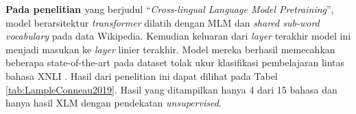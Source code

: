 \textbf{Pada penelitian \parencite{LampleConneau2019}} yang berjudul “\textit{Cross-lingual Language Model Pretraining}”, model berarsitektur \textit{transformer} dilatih dengan MLM dan \textit{shared sub-word vocabulary} pada data Wikipedia. Kemudian keluaran dari \textit{layer} terakhir model ini menjadi masukan ke \textit{layer} linier terakhir. Model mereka berhasil memecahkan beberapa state-of-the-art pada  dataset tolak ukur klasifikasi pembelajaran lintas bahasa XNLI \parencite{Conneau_Rinott_Lample_Williams_Bowman_Schwenk_Stoyanov_2018}. Hasil dari penelitian ini dapat dilihat pada Tabel \ref{tab:LampleConneau2019}. Hasil yang ditampilkan hanya 4 dari 15 bahasa dan hanya hasil XLM dengan pendekatan \textit{unsupervised}.



